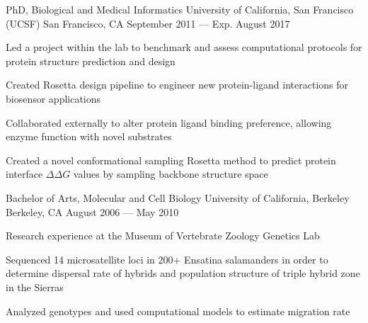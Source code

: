 

\begin{cventries}

  \cventry
  {PhD, Biological and Medical Informatics} %
  {University of California, San Francisco (UCSF)} %
  {San Francisco, CA} %
  {September 2011 --- Exp. August 2017} %
  {
    \begin{cvitems} %
    \item Led a project within the lab to benchmark and assess computational protocols for protein structure prediction and design
    \item Created Rosetta design pipeline to
      engineer new protein-ligand interactions for biosensor applications
    \item Collaborated externally to alter protein ligand binding preference, allowing enzyme function with novel substrates
    \item Created a novel conformational sampling Rosetta method to predict protein interface $\Delta\Delta G$ values by sampling backbone structure space
    \end{cvitems}
  }

  \cventry
  {Bachelor of Arts, Molecular and Cell Biology} %
  {University of California, Berkeley} %
  {Berkeley, CA} %
  {August 2006 --- May 2010} %
  {
    \begin{cvitems} %
    \item Research experience at the Museum of Vertebrate Zoology Genetics Lab
    \item Sequenced 14 microsatellite loci in 200+ Ensatina salamanders in order to determine dispersal rate of hybrids and population structure of triple hybrid zone in the Sierras
    \item Analyzed genotypes and used computational models to estimate migration rate
    \end{cvitems}
  }

\end{cventries}
